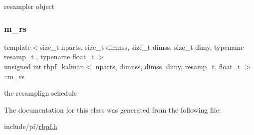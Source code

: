 resampler object \mbox{\label{classrbpf__kalman_a625192fecb630044a08a445f0abb7cdf}} 
\subsubsection{\texorpdfstring{m\+\_\+rs}{m\_rs}}
{\footnotesize\ttfamily template$<$size\+\_\+t nparts, size\+\_\+t dimnss, size\+\_\+t dimss, size\+\_\+t dimy, typename resamp\+\_\+t , typename float\+\_\+t $>$ \\
unsigned int \hyperlink{classrbpf__kalman}{rbpf\+\_\+kalman}$<$ nparts, dimnss, dimss, dimy, resamp\+\_\+t, float\+\_\+t $>$\+::m\+\_\+rs\hspace{0.3cm}{\ttfamily [private]}}

the resamplign schedule 

The documentation for this class was generated from the following file\+:\begin{DoxyCompactItemize}
\item 
include/pf/\hyperlink{rbpf_8h}{rbpf.\+h}\end{DoxyCompactItemize}
